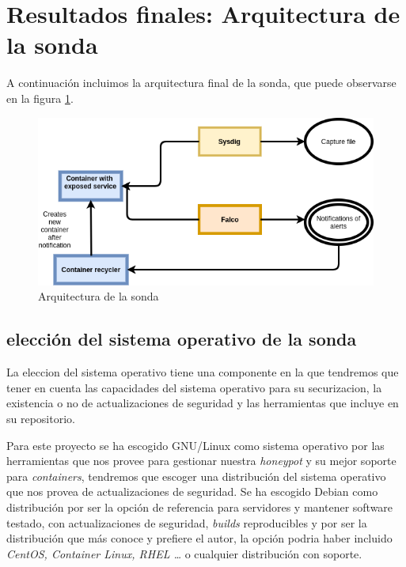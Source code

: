\section{Resultados finales: Arquitectura de la sonda}

A continuación incluimos la arquitectura final de la sonda, que puede observarse en la figura \ref{fig:arquitectura-sonda}.

\begin{figure}[h]
    \centering
      \includegraphics[scale=0.5]{images/probe_architecture}
    \caption{Arquitectura de la sonda}
    \label{fig:arquitectura-sonda}
  \end{figure}

\subsection{elección del sistema operativo de la sonda}
\label{subsec:sonda-so}
  
La eleccion del sistema operativo tiene una componente en la que tendremos que tener en cuenta las capacidades del sistema operativo para su securizacion,
la existencia o no de actualizaciones de seguridad y las herramientas que incluye en su repositorio.

Para este proyecto se ha escogido GNU/Linux como sistema operativo por las herramientas que nos provee para gestionar nuestra \emph{honeypot} y su mejor soporte
para \emph{containers}, tendremos que escoger una distribución del sistema operativo que nos provea de actualizaciones de seguridad. 
Se ha escogido Debian como distribución por ser la opción de referencia para servidores y mantener software testado, con actualizaciones de seguridad, 
\emph{builds} reproducibles y por ser la distribución que más conoce y prefiere el autor,
 la opción podria haber incluido \emph{CentOS, Container Linux, RHEL \ldots} o cualquier distribución con soporte. 


